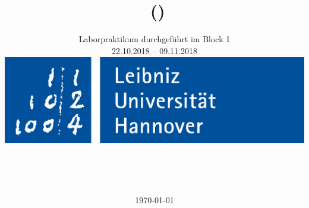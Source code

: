 \title{ \\ \grpnr $ $ (\Versuchsnummer)}
\subtitle{Laborpraktikum durchgeführt im Block 1\\
22.10.2018 – 09.11.2018
\vspace{1cm}\\
 \includegraphics[width=.75\linewidth]{IMAGE/luh_logo.png}}
\author{
\authA\\
\matA
\and
\authB\\
\matB
}
\date{\today}

\pagestyle{empty} %
\setcounter{page}{0} %
\maketitle %

\newpage 

\thispagestyle{empty}
\tableofcontents
\pagestyle{scrheadings}

\setcounter{page}{1}
\newpage
